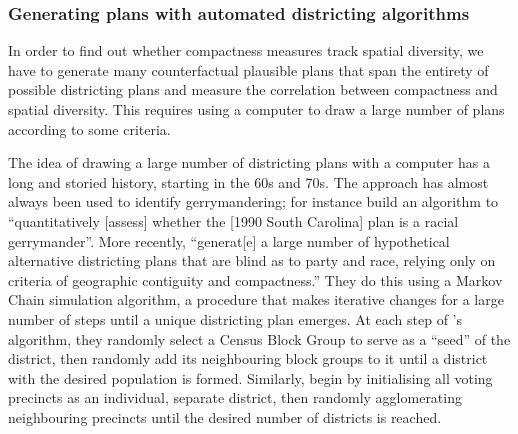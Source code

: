 \documentclass[]{article}
\begin{document}
\hypertarget{generating-plans-with-automated-districting-algorithms}{%
\subsubsection{Generating plans with automated districting
algorithms}\label{generating-plans-with-automated-districting-algorithms}}

In order to find out whether compactness measures track spatial
diversity, we have to generate many counterfactual plausible plans that
span the entirety of possible districting plans and measure the
correlation between compactness and spatial diversity. This requires
using a computer to draw a large number of plans according to some
criteria.

The idea of drawing a large number of districting plans with a computer
has a long and storied history, starting in the 60s and 70s. The
approach has almost always been used to identify gerrymandering; for
instance \cite{ccd2000} build an algorithm to ``quantitatively
{[}assess{]} whether the {[}1990 South Carolina{]} plan is a racial
gerrymander''. More recently, \cite{cr2013} ``generat{[}e{]} a large
number of hypothetical alternative districting plans that are blind as
to party and race, relying only on criteria of geographic contiguity and
compactness.'' They do this using a Markov Chain simulation algorithm, a
procedure that makes iterative changes for a large number of steps until
a unique districting plan emerges. At each step of
\citeauthor{ccd2000}'s algorithm, they randomly select a Census Block
Group to serve as a ``seed'' of the district, then randomly add its
neighbouring block groups to it until a district with the desired
population is formed. Similarly, \citeauthor{cr2013} begin by
initialising all voting precincts as an individual, separate district,
then randomly agglomerating neighbouring precincts until the desired
number of districts is reached.
\end{document}
